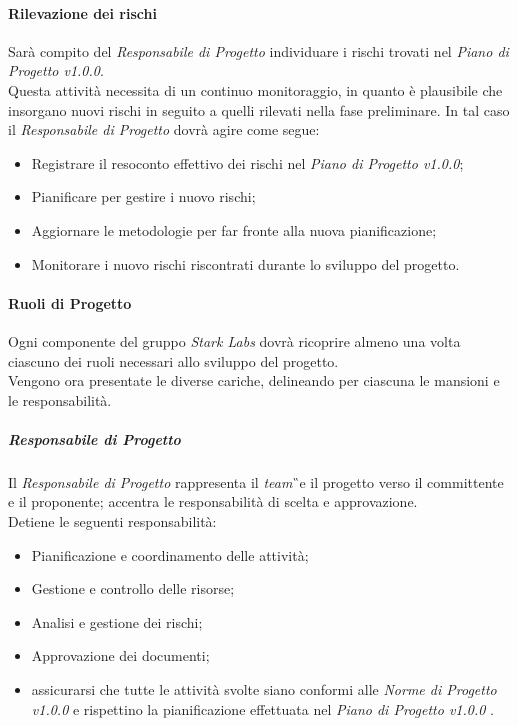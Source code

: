\paragraph{Rilevazione dei rischi}
Sarà compito del \textit{Responsabile di Progetto} individuare i rischi trovati nel \textit{Piano di Progetto v1.0.0}.\\
Questa attività necessita di un continuo monitoraggio, in quanto è plausibile che insorgano nuovi rischi in seguito a quelli rilevati nella fase preliminare. In tal caso il \textit{Responsabile di Progetto} dovrà agire come segue:
\begin{itemize}
\item Registrare il resoconto effettivo dei rischi nel \textit{Piano di Progetto v1.0.0};
\item Pianificare per gestire i nuovo rischi;
\item Aggiornare le metodologie per far fronte alla nuova pianificazione;
\item Monitorare i nuovo rischi riscontrati durante lo sviluppo del progetto. 
\end{itemize}

\paragraph{Ruoli di Progetto}
Ogni componente del gruppo \textit{Stark Labs} dovrà ricoprire almeno una volta ciascuno dei ruoli necessari allo sviluppo del progetto.\\
Vengono ora presentate le diverse cariche, delineando per ciascuna le mansioni e le responsabilità.

\subparagraph{Responsabile di Progetto} Il \textit{Responsabile di Progetto} rappresenta il \textit{team}\G\ e il progetto verso il committente e il proponente; accentra le responsabilità di scelta e approvazione.\\
Detiene le seguenti responsabilità:
\begin{itemize}
\item Pianificazione e coordinamento delle attività;
\item Gestione e controllo delle risorse;
\item Analisi e gestione dei rischi;
\item Approvazione dei documenti;
\item assicurarsi che tutte le attività svolte siano conformi alle \textit{Norme di Progetto
v1.0.0} e rispettino la pianificazione effettuata nel \textit{Piano di Progetto v1.0.0} .
\end{itemize}  

